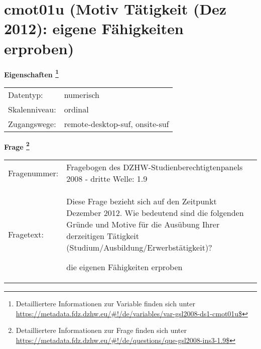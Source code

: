 
    \setcounter{footnote}{0}

    \vspace*{-1.8cm}
	\section{cmot01u (Motiv Tätigkeit (Dez 2012): eigene Fähigkeiten erproben)}
	\label{section:cmot01u}



    \vspace*{0.5cm}
    \noindent\textbf{Eigenschaften
	\footnote{Detailliertere Informationen zur Variable finden sich unter
		\url{https://metadata.fdz.dzhw.eu/\#!/de/variables/var-gsl2008-ds1-cmot01u$}}}\\
	\begin{tabularx}{\hsize}{@{}lX}
	Datentyp: & numerisch \\
	Skalenniveau: & ordinal \\
	Zugangswege: &
	  remote-desktop-suf, 
	  onsite-suf
 \\
    \end{tabularx}



				\vspace*{0.5cm}
                \noindent\textbf{Frage
	                \footnote{Detailliertere Informationen zur Frage finden sich unter
		              \url{https://metadata.fdz.dzhw.eu/\#!/de/questions/que-gsl2008-ins3-1.9$}}}\\
				\begin{tabularx}{\hsize}{@{}lX}
					Fragenummer: &
					  Fragebogen des DZHW-Studienberechtigtenpanels 2008 - dritte Welle:
					  1.9
 \\
					Fragetext: & Diese Frage bezieht sich auf den Zeitpunkt Dezember 2012. Wie bedeutend sind die folgenden Gründe und Motive für die Ausübung Ihrer derzeitigen Tätigkeit (Studium/Ausbildung/Erwerbstätigkeit)?\par  die eigenen Fähigkeiten erproben \\
				\end{tabularx}





